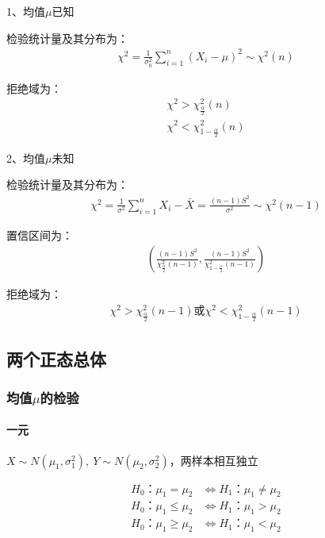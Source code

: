 \documentclass[12pt]{book}
\begin{document}
1、均值$\mu$已知

检验统计量及其分布为：
\begin{gather*}
    \chi^2=\frac{1}{\sigma_0^2}\sum_{i=1}^{n}{(X_i-\mu)^2}\sim \chi^2(n)
\end{gather*}


拒绝域为：
\begin{gather*}
    \chi^2>\chi_{\frac{\alpha}{2}}^{2}(n)\\
    \chi^2<\chi_{1-\frac{\alpha}{2}}^{2}(n)
\end{gather*}


2、均值$\mu$未知

检验统计量及其分布为：
\begin{gather*}
    \chi^2=\frac{1}{\sigma^2}\sum_{i=1}^{n}{X_i- \bar{X}} =\frac{(n-1)S^2}{\sigma^2} \sim \chi^2(n-1)
\end{gather*}


置信区间为：
\begin{gather*}
    \left( \frac{(n-1)S^2}{\chi_{\frac{\alpha}{2}}^{2} (n-1)}, \frac{(n-1)S^2}{\chi_{1-\frac{\alpha}{2}}^{2} (n-1)} \right)
\end{gather*}


拒绝域为：
\begin{gather*}
    \chi^2>\chi_{\frac{\alpha}{2}}^2(n-1) 或 χ^2<χ_{1-\frac{\alpha}{2}}^2(n-1)
\end{gather*}













\subsection{两个正态总体}





\subsubsection{均值$\mu$的检验}

\paragraph{一元}
$X\sim N\left(\mu_1,\sigma_1^2\right),\ Y\sim N\left(\mu_2,\sigma_2^2\right)$，两样本相互独立

\begin{align*}
    H_0：\mu_1=\mu_2    & \Leftrightarrow H_1：\mu_1\neq\mu_2 \\
    H_0：\mu_1\le\mu_2  & \Leftrightarrow H_1：\mu_1>\mu_2    \\
    H_0：\mu_1\geq\mu_2 & \Leftrightarrow H_1：\mu_1<\mu_2
\end{align*}
\end{document}
